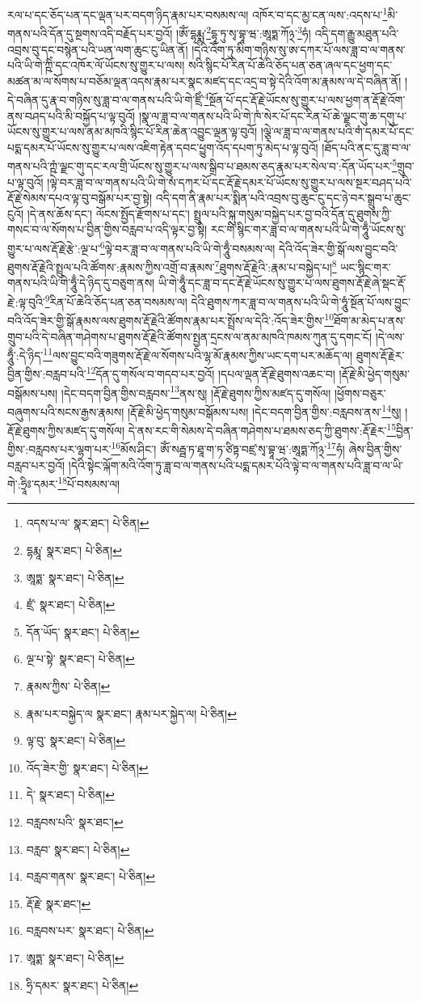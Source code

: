 རལ་པ་དང་ཅོད་པན་དང་ལྡན་པར་བདག་ཉིད་རྣམ་པར་བསམས་ལ། འཁོར་བ་དང་མྱ་ངན་ལས་:འདས་པ་\footnote{འདས་པ་ལ་  སྣར་ཐང་།  པེ་ཅིན། }མི་གནས་པའི་དོན་དུ་སྔགས་འདི་བརྗོད་པར་བྱའོ། །ཨོཾ་དྷརྨྨ་\footnote{དྷརྨཱ་  སྣར་ཐང་།  པེ་ཅིན། }དྷཱ་ཏུ་སྭ་བྷཱ་ཝ་:ཨཱཏྨ་ཀོ྅་\footnote{ཨཱཏྨ་  སྣར་ཐང་།  པེ་ཅིན། }ཧཾ། འདི་དག་རྒྱུ་མཐུན་པའི་འབྲས་བུ་དང་བསྙེན་པའི་ཡན་ལག་ཆུང་ངུ་ཡིན་ནོ། །དེའི་འོག་ཏུ་མིག་གཉིས་སུ་ཨ་དཀར་པོ་ལས་ཟླ་བ་ལ་གནས་པའི་ཡི་གེ་ཀྵིཾ་དང་འཁོར་ལོ་ཡོངས་སུ་གྱུར་པ་ལས། སའི་སྙིང་པོ་རིན་པོ་ཆེའི་ཅོད་པན་ཅན་ཞལ་དང་ཕྱག་དང་མཚན་མ་ལ་སོགས་པ་བཅོམ་ལྡན་འདས་རྣམ་པར་སྣང་མཛད་དང་འདྲ་བ་སྟེ་དེའི་འོག་མ་རྣམས་ལ་དེ་བཞིན་ནོ། །དེ་བཞིན་དུ་རྣ་བ་གཉིས་སུ་ཟླ་བ་ལ་གནས་པའི་ཡི་གེ་ཛྲིཾ་\footnote{ཛྲཾ་  སྣར་ཐང་།  པེ་ཅིན། }སྔོན་པོ་དང་རྡོ་རྗེ་ཡོངས་སུ་གྱུར་པ་ལས་ཕྱག་ན་རྡོ་རྗེ་འོག་ནས་བཤད་པའི་མི་བསྐྱོད་པ་ལྟ་བུའོ། །སྣ་ལ་ཟླ་བ་ལ་གནས་པའི་ཡི་གེ་ཁཾ་སེར་པོ་དང་རིན་པོ་ཆེ་ལྗང་གུ་ཆ་དགུ་པ་ཡོངས་སུ་གྱུར་པ་ལས་ནམ་མཁའི་སྙིང་པོ་རིན་ཆེན་འབྱུང་ལྡན་ལྟ་བུའོ། །ལྕེ་ལ་ཟླ་བ་ལ་གནས་པའི་གཾ་དམར་པོ་དང་པདྨ་དམར་པོ་ཡོངས་སུ་གྱུར་པ་ལས་འཇིག་རྟེན་དབང་ཕྱུག་འོད་དཔག་ཏུ་མེད་པ་ལྟ་བུའོ། །ཐོད་པའི་ནང་དུ་ཟླ་བ་ལ་གནས་པའི་ཀྵཾ་ལྗང་གུ་དང་རལ་གྲི་ཡོངས་སུ་གྱུར་པ་ལས་སྒྲིབ་པ་ཐམས་ཅད་རྣམ་པར་སེལ་བ་:དོན་ཡོད་པར་\footnote{དོན་ཡོད་  སྣར་ཐང་།  པེ་ཅིན། }གྲུབ་པ་ལྟ་བུའོ། །ལྟེ་བར་ཟླ་བ་ལ་གནས་པའི་ཡི་གེ་སཾ་དཀར་པོ་དང་རྡོ་རྗེ་དམར་པོ་ཡོངས་སུ་གྱུར་པ་ལས་སྔར་བཤད་པའི་རྡོ་རྗེ་སེམས་དཔའ་ལྟ་བུ་བསྒོམ་པར་བྱ་སྟེ། འདི་དག་ནི་རྣམ་པར་སྨིན་པའི་འབྲས་བུ་ཆུང་ངུ་དང་ཉེ་བར་སྒྲུབ་པ་ཆུང་ངུའོ། །དེ་ནས་ཆོས་དང་། ལོངས་སྤྱོད་རྫོགས་པ་དང་། སྤྲུལ་པའི་སྐུ་གསུམ་བསྐྱེད་པར་བྱ་བའི་དོན་དུ་ཐུགས་ཀྱི་གསང་བ་ལ་སོགས་པ་བྱིན་གྱིས་བརླབ་པ་འདི་ལྟར་བྱ་སྟེ། རང་གི་སྙིང་གར་ཟླ་བ་ལ་གནས་པའི་ཡི་གེ་ཧཱུྃ་ཡོངས་སུ་གྱུར་པ་ལས་རྡོ་རྗེ་རྩེ་:ལྔ་པ་\footnote{ལྔ་པ་སྟེ་  སྣར་ཐང་།  པེ་ཅིན། }ལྟེ་བར་ཟླ་བ་ལ་གནས་པའི་ཡི་གེ་ཧཱུྃ་བསམས་ལ། དེའི་འོད་ཟེར་གྱི་སྒོ་ལས་བྱུང་བའི་ཐུགས་རྡོ་རྗེའི་སྤྲུལ་པའི་ཚོགས་:རྣམས་ཀྱིས་འགྲོ་བ་རྣམས་\footnote{རྣམས་ཀྱིས་  པེ་ཅིན། }ཐུགས་རྡོ་རྗེའི་:རྣམ་པ་བསྐྱེད་པ།\footnote{རྣམ་པར་བསྐྱེད་ལ  སྣར་ཐང་། རྣམ་པར་སྐྱེད་ལ།  པེ་ཅིན། } ཡང་སྙིང་གར་གནས་པའི་ཡི་གེ་ཧཱུྃ་དེ་ཉིད་དུ་བཅུག་ནས། ཡི་གེ་ཧཱུྃ་དང་ཟླ་བ་དང་རྡོ་རྗེ་ཡོངས་སུ་གྱུར་པ་ལས་ཐུགས་རྡོ་རྗེ་ཞེ་སྡང་རྡོ་རྗེ་:ལྟ་བུའི་\footnote{ལྟ་བུ་  སྣར་ཐང་།  པེ་ཅིན། }རིན་པོ་ཆེའི་ཅོད་པན་ཅན་བསམས་ལ། དེའི་ཐུགས་ཀར་ཟླ་བ་ལ་གནས་པའི་ཡི་གེ་ཧཱུཾ་སྔོན་པོ་ལས་བྱུང་བའི་འོད་ཟེར་གྱི་སྒོ་རྣམས་ལས་ཐུགས་རྡོ་རྗེའི་ཚོགས་རྣམ་པར་སྤྲོས་ལ་དེའི་:འོད་ཟེར་གྱིས་\footnote{འོད་ཟེར་གྱི་  སྣར་ཐང་།  པེ་ཅིན། }ཐོག་མ་མེད་པ་ནས་གྲུབ་པའི་དེ་བཞིན་གཤེགས་པ་ཐུགས་རྡོ་རྗེའི་ཚོགས་སྤྱན་དྲངས་ལ་ནམ་མཁའི་ཁམས་ཀུན་དུ་དགང་ངོ། །དེ་ལས་ཧཱུྃ་:དེ་ཉིད་\footnote{དེ་  སྣར་ཐང་།  པེ་ཅིན། }ལས་བྱུང་བའི་གཟུགས་རྡོ་རྗེ་ལ་སོགས་པའི་ལྷ་མོ་རྣམས་ཀྱིས་ཡང་དག་པར་མཆོད་ལ། ཐུགས་རྡོ་རྗེར་བྱིན་གྱིས་:བརླབ་པའི་\footnote{བརླབས་པའི་  སྣར་ཐང་། }དོན་དུ་གསོལ་བ་གདབ་པར་བྱའོ། །དཔལ་ལྡན་རྡོ་རྗེ་ཐུགས་འཆང་བ། །རྡོ་རྗེ་མི་ཕྱེད་གསུམ་བསྒོམས་པས། །དེང་བདག་བྱིན་གྱིས་བརླབས་\footnote{བརླབ་  སྣར་ཐང་།  པེ་ཅིན། }ནས་སུ། །རྡོ་རྗེ་ཐུགས་ཀྱིས་མཛད་དུ་གསོལ། །ཕྱོགས་བཅུར་བཞུགས་པའི་སངས་རྒྱས་རྣམས། །རྡོ་རྗེ་མི་ཕྱེད་གསུམ་བསྒོམས་པས། །དེང་བདག་བྱིན་གྱིས་:བརླབས་ནས་\footnote{བརླབ་གནས་  སྣར་ཐང་།  པེ་ཅིན། }སུ། །རྡོ་རྗེ་ཐུགས་ཀྱིས་མཛད་དུ་གསོལ། དེ་ནས་རང་གི་སེམས་དེ་བཞིན་གཤེགས་པ་ཐམས་ཅད་ཀྱི་ཐུགས་:རྡོ་རྗེར་\footnote{རྡོ་རྗེ་  སྣར་ཐང་། }བྱིན་གྱིས་:བརླབས་པར་ལྷག་པར་\footnote{བརླབས་པར་  སྣར་ཐང་།  པེ་ཅིན། }མོས་ཤིང་། ཨོཾ་སརྦྦ་ཏ་ཐཱ་ག་ཏ་ཙིཏྟ་བཛྲ་སྭ་བྷཱ་ཝ་:ཨཱཏྨ་ཀོ྅་\footnote{ཨཱཏྨ་  སྣར་ཐང་།  པེ་ཅིན། }ཧཾ། ཞེས་བྱིན་གྱིས་བརླབ་པར་བྱའོ། །དེའི་སྟེང་ལྐོག་མའི་འོག་ཏུ་ཟླ་བ་ལ་གནས་པའི་པདྨ་དམར་པོའི་ལྟེ་བ་ལ་གནས་པའི་ཟླ་བ་ལ་ཡི་གེ་:ཧྲཱིཿ་དམར་\footnote{ཧྲི་དམར་  སྣར་ཐང་།  པེ་ཅིན། }པོ་བསམས་ལ། 